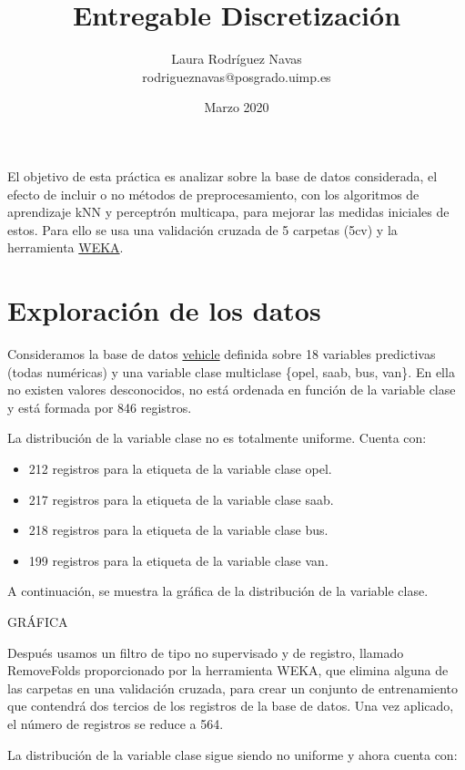 \documentclass{article}
\title{Entregable Discretización}
\author{Laura Rodríguez Navas \\ rodrigueznavas@posgrado.uimp.es}
\date{Marzo 2020}
\begin{document}
\maketitle

El objetivo de esta práctica es analizar sobre la base de datos considerada, el efecto de incluir o no métodos de preprocesamiento, con los algoritmos de aprendizaje kNN y perceptrón multicapa, para mejorar las medidas iniciales de estos. Para ello se usa una validación cruzada de 5 carpetas (5cv) y la herramienta \href{https://www.cs.waikato.ac.nz/ml/weka/}{WEKA}.

\section*{Exploración de los datos}

Consideramos la base de datos \href{https://github.com/renatopp/arff-datasets/blob/master/classification/vehicle.arff}{vehicle} definida sobre 18 variables predictivas (todas numéricas) y una variable clase multiclase \{opel, saab, bus, van\}. En ella no existen valores desconocidos, no está ordenada en función de la variable clase y está formada por 846 registros. 

La distribución de la variable clase no es totalmente uniforme. Cuenta con:

\begin{itemize}
	\item 212 registros para la etiqueta de la variable clase opel.
	\item 217 registros para la etiqueta de la variable clase saab.
	\item 218 registros para la etiqueta de la variable clase bus.
	\item 199 registros para la etiqueta de la variable clase van.
\end{itemize}

A continuación, se muestra la gráfica de la distribución de la variable clase.

GRÁFICA

Después usamos un filtro de tipo no supervisado y de registro, llamado RemoveFolds proporcionado por la herramienta WEKA, que elimina alguna de las carpetas en una validación cruzada, para crear un conjunto de entrenamiento que contendrá dos tercios de los registros de la base de datos. Una vez aplicado, el número de registros se reduce a 564.

La distribución de la variable clase sigue siendo no uniforme y ahora cuenta con:
\end{document}
